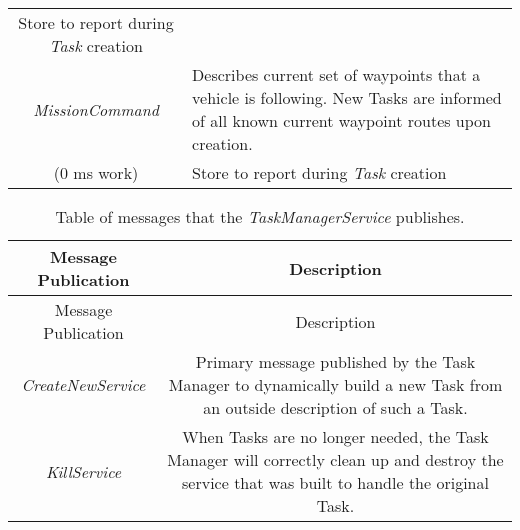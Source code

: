 \begin{longtable}[]{@{}cl@{}}
\begin{minipage}[t]{0.55\columnwidth}
Store to report during \emph{Task} creation\strut
\end{minipage}\tabularnewline
\begin{minipage}[t]{0.40\columnwidth}\centering\strut
\emph{MissionCommand}\strut
\end{minipage} & \begin{minipage}[t]{0.55\columnwidth}\raggedright\strut
Describes current set of waypoints that a vehicle is following. New
Tasks are informed of all known current waypoint routes upon
creation.\strut
\end{minipage}\tabularnewline
\begin{minipage}[t]{0.40\columnwidth}\centering\strut
(0 ms work)\strut
\end{minipage} & \begin{minipage}[t]{0.55\columnwidth}\raggedright\strut
Store to report during \emph{Task} creation\strut
\end{minipage}\tabularnewline
\bottomrule
\end{longtable}

\begin{longtable}[]{@{}cc@{}}
\caption{Table of messages that the \emph{TaskManagerService}
publishes.}\tabularnewline
\toprule
\begin{minipage}[b]{0.40\columnwidth}\centering\strut
Message Publication\strut
\end{minipage} & \begin{minipage}[b]{0.55\columnwidth}\centering\strut
Description\strut
\end{minipage}\tabularnewline
\midrule
\endfirsthead
\toprule
\begin{minipage}[b]{0.40\columnwidth}\centering\strut
Message Publication\strut
\end{minipage} & \begin{minipage}[b]{0.55\columnwidth}\centering\strut
Description\strut
\end{minipage}\tabularnewline
\midrule
\endhead
\begin{minipage}[t]{0.40\columnwidth}\centering\strut
\emph{CreateNewService}\strut
\end{minipage} & \begin{minipage}[t]{0.55\columnwidth}\centering\strut
Primary message published by the Task Manager to dynamically build a new
Task from an outside description of such a Task.\strut
\end{minipage}\tabularnewline
\begin{minipage}[t]{0.40\columnwidth}\centering\strut
\emph{KillService}\strut
\end{minipage} & \begin{minipage}[t]{0.55\columnwidth}\centering\strut
When Tasks are no longer needed, the Task Manager will correctly clean
up and destroy the service that was built to handle the original
Task.\strut
\end{minipage}\tabularnewline
\bottomrule
\end{longtable}

